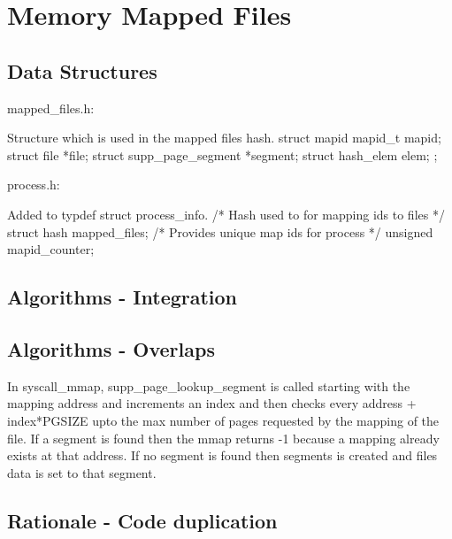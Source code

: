 \section{Memory Mapped Files}

\subsection{Data Structures}


mapped\_files.h:

Structure which is used in the mapped files hash.
struct mapid
  {
    mapid\_t mapid;
    struct file *file;
    struct supp\_page\_segment *segment;
    struct hash\_elem elem;
  };

process.h:

Added to typdef struct process\_info.
  /* Hash used to for mapping ids to files */
  struct hash mapped\_files;
  /* Provides unique map ids for process */
  unsigned mapid\_counter;

\subsection{Algorithms - Integration}


\subsection{Algorithms - Overlaps}


In syscall\_mmap, supp\_page\_lookup\_segment is called starting with the mapping address and increments an index and then checks every address + index*PGSIZE upto the max number of pages requested by the mapping of the file. If a segment is found then the mmap returns -1 because a mapping already exists at that address. If no segment is found then segments is created and files data is set to that segment.

\subsection{Rationale - Code duplication}

